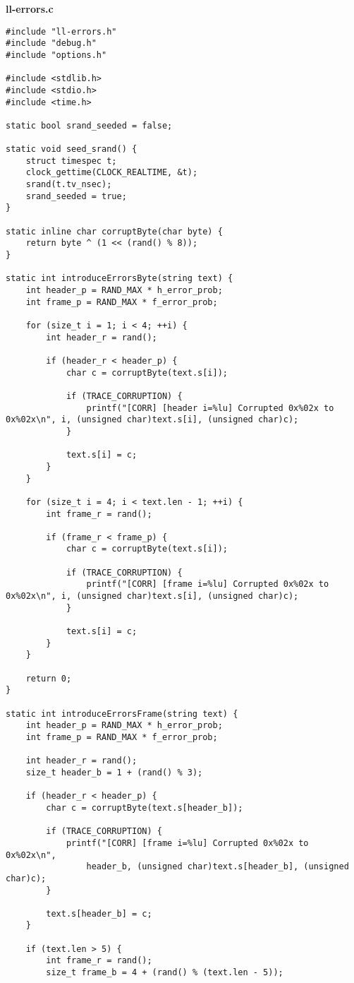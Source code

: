 \documentclass[subfiles]{main.tex}
\begin{document}
{\Large\textbf{ll-errors.c}}

\begin{lstlisting}[style=rcom]
#include "ll-errors.h"
#include "debug.h"
#include "options.h"

#include <stdlib.h>
#include <stdio.h>
#include <time.h>

static bool srand_seeded = false;

static void seed_srand() {
	struct timespec t;
	clock_gettime(CLOCK_REALTIME, &t);
	srand(t.tv_nsec);
	srand_seeded = true;
}

static inline char corruptByte(char byte) {
	return byte ^ (1 << (rand() % 8));
}

static int introduceErrorsByte(string text) {
	int header_p = RAND_MAX * h_error_prob;
	int frame_p = RAND_MAX * f_error_prob;
	
	for (size_t i = 1; i < 4; ++i) {
		int header_r = rand();
		
		if (header_r < header_p) {
			char c = corruptByte(text.s[i]);
			
			if (TRACE_CORRUPTION) {
				printf("[CORR] [header i=%lu] Corrupted 0x%02x to 0x%02x\n", i, (unsigned char)text.s[i], (unsigned char)c);
			}
			
			text.s[i] = c;
		}
	}
	
	for (size_t i = 4; i < text.len - 1; ++i) {
		int frame_r = rand();
		
		if (frame_r < frame_p) {
			char c = corruptByte(text.s[i]);
			
			if (TRACE_CORRUPTION) {
				printf("[CORR] [frame i=%lu] Corrupted 0x%02x to 0x%02x\n", i, (unsigned char)text.s[i], (unsigned char)c);
			}
			
			text.s[i] = c;
		}
	}
	
	return 0;
}

static int introduceErrorsFrame(string text) {
	int header_p = RAND_MAX * h_error_prob;
	int frame_p = RAND_MAX * f_error_prob;
	
	int header_r = rand();
	size_t header_b = 1 + (rand() % 3);
	
	if (header_r < header_p) {
		char c = corruptByte(text.s[header_b]);
		
		if (TRACE_CORRUPTION) {
			printf("[CORR] [frame i=%lu] Corrupted 0x%02x to 0x%02x\n",
				header_b, (unsigned char)text.s[header_b], (unsigned char)c);
		}
		
		text.s[header_b] = c;
	}
	
	if (text.len > 5) {
		int frame_r = rand();
		size_t frame_b = 4 + (rand() % (text.len - 5));
		

\end{lstlisting}
\end{document}
